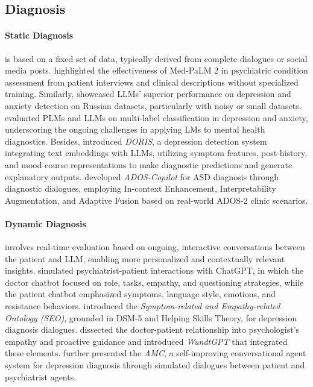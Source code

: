 \subsection{Diagnosis}

\paragraph{Static Diagnosis} is based on a fixed set of data, typically derived from complete dialogues or social media posts.  highlighted the effectiveness of Med-PaLM 2 in psychiatric condition assessment from patient interviews and clinical descriptions without specialized training. Similarly,  showcased LLMs' superior performance on depression and anxiety detection on Russian datasets, particularly with noisy or small datasets.  evaluated PLMs and LLMs on multi-label classification in depression and anxiety, underscoring the ongoing challenges in applying LMs to mental health diagnostics. Besides,  introduced \textit{DORIS}, a depression detection system integrating text embeddings with LLMs, utilizing symptom features, post-history, and mood course representations to make diagnostic predictions and generate explanatory outputs.  developed \textit{ADOS-Copilot} for ASD diagnosis through diagnostic dialogues, employing In-context Enhancement, Interpretability Augmentation, and Adaptive Fusion based on real-world ADOS-2 clinic scenarios.

\paragraph{Dynamic Diagnosis} involves real-time evaluation based on ongoing, interactive conversations between the patient and LLM, enabling more personalized and contextually relevant insights.  simulated psychiatrist-patient interactions with ChatGPT, in which the doctor chatbot focused on role, tasks, empathy, and questioning strategies, while the patient chatbot emphasized symptoms, language style, emotions, and resistance behaviors.  introduced the \textit{Symptom-related and Empathy-related Ontology (SEO)}, grounded in DSM-5 and Helping Skills Theory, for depression diagnosis dialogues.  dissected the doctor-patient relationship into psychologist’s empathy and proactive guidance and introduced \textit{WundtGPT} that integrated these elements.  further presented the \textit{AMC}, a self-improving conversational agent system for depression diagnosis through simulated dialogues between patient and psychiatrist agents.



